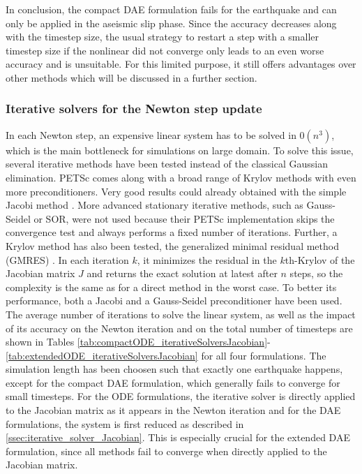 \begin{figure}[H]
\end{figure}

In conclusion, the compact DAE formulation fails for the earthquake and can only be applied in the aseismic slip phase. Since the accuracy decreases along with the timestep size, the usual strategy to restart a step with a smaller timestep size if the nonlinear did not converge only leads to an even worse accuracy and is unsuitable. For this limited purpose, it still offers advantages over other methods which will be discussed in a further section.

\subsubsection{Iterative solvers for the Newton step update}
In each Newton step, an expensive linear system has to be solved in $\mathcal{0}\left(n^3\right)$, which is the main bottleneck for simulations on large domain. To solve this issue, several iterative methods have been tested  instead of the classical Gaussian elimination. PETSc comes along with a broad range of Krylov methods with even more preconditioners. Very good results could already obtained with the simple Jacobi method \cite[p. 230]{IterativeSolutionMethods}. More advanced stationary iterative methods, such as Gauss-Seidel or SOR, were not used because their PETSc implementation skips the convergence test and always performs a fixed number of iterations. Further, a Krylov method has also been tested, the generalized minimal residual method (GMRES) \cite{GMRES}. In each iteration $k$, it minimizes the residual in the $k$th-Krylov of the Jacobian matrix $J$ and returns the exact solution at latest after $n$ steps, so the complexity is the same as for a direct method in the worst case. To better its performance, both a Jacobi and a Gauss-Seidel preconditioner have been used. \\
The average number of iterations to solve the linear system, as well as the impact of its accuracy on the Newton iteration and on the total number of timesteps are shown in Tables \ref{tab:compactODE_iterativeSolversJacobian}-\ref{tab:extendedODE_iterativeSolversJacobian} for all four formulations. The simulation length has been choosen such that exactly one earthquake happens, except for the compact DAE formulation, which generally fails to converge for small timesteps. For the ODE formulations, the iterative solver is directly applied to the Jacobian matrix as it appears in the Newton iteration and for the DAE formulations, the system is first reduced as described in \autoref{ssec:iterative_solver_Jacobian}. This is especially crucial for the extended DAE formulation, since all methods fail to converge when directly applied to the Jacobian matrix. 

